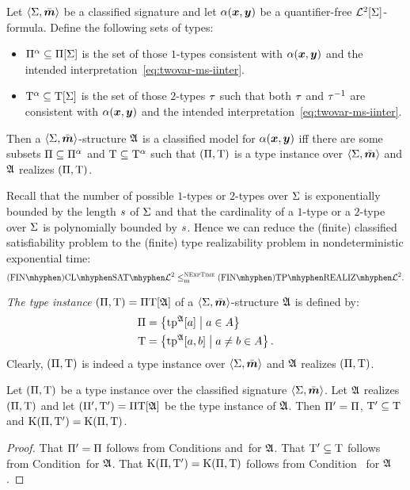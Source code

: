 \begin{remark}\label{rem:red-sat-to-real}
Let $\left\langle \mathrm{\Sigma},\bar{\bm{m}} \right\rangle$ be a classified signature and let $\alpha(\bm{x},\bm{y})$ be a
quantifier-free $\mathcal{L}^{2}[\mathrm{\Sigma}]$-formula.
Define the following sets of types:
\begin{itemize}
  \item $\Pi^\alpha \subseteq \Pi[\mathrm{\Sigma}]$ is the set of those $1$-types
  consistent with $\alpha(\bm{x},\bm{y})$ and the intended
  interpretation~\cref{eq:twovar-ms-iinter}.
  \item $\mathrm{T}^\alpha \subseteq \mathrm{T}[\mathrm{\Sigma}]$ is the set of those $2$-types $\tau$
  such that both $\tau$ and $\tau^{-1}$ are consistent with $\alpha(\bm{x},\bm{y})$
  and the intended interpretation~\cref{eq:twovar-ms-iinter}.
\end{itemize}
Then a $\left\langle \mathrm{\Sigma},\bar{\bm{m}} \right\rangle$-structure $\mathfrak{A}$ is a classified model for
$\alpha(\bm{x},\bm{y})$ iff there are some subsets $\Pi \subseteq \Pi^\alpha$ and
$\mathrm{T} \subseteq \mathrm{T}^\alpha$ such that $(\Pi,\mathrm{T})$ is a type instance
over $\left\langle \mathrm{\Sigma},\bar{\bm{m}} \right\rangle$ and $\mathfrak{A}$ realizes $(\Pi,\mathrm{T})$.

Recall that the number of possible $1$-types or $2$-types over $\mathrm{\Sigma}$ is
exponentially bounded by the length $s$ of $\mathrm{\Sigma}$ and that the cardinality
of a $1$-type or a $2$-type over $\mathrm{\Sigma}$ is polynomially bounded by $s$.
Hence we can reduce the (finite) classified satisfiability problem to the
(finite) type realizability problem in nondeterministic exponential time:
\[
  \FinAClSat{\vFo2} \red\cNExpTime \FinAReal{\vFo2}.
\]
\end{remark}

\begin{definition}
\emph{The type instance} $(\Pi,\mathrm{T}) = \Pi\mathrm{T}[\mathfrak{A}]$ of a
$\left\langle \mathrm{\Sigma},\bar{\bm{m}} \right\rangle$-structure $\mathfrak{A}$ is defined by:
\begin{align*}
  \Pi &= \left\{\operatorname{tp}^{\mathfrak{A}}[a]\mathrel{}\middle|\mathrel{}a \in A\right\} \\
  \mathrm{T} &= \left\{\operatorname{tp}^{\mathfrak{A}}[a,b]\mathrel{}\middle|\mathrel{}a\neq b \in A\right\}.
\end{align*}
Clearly, $(\Pi,\mathrm{T})$ is indeed a type instance over $\left\langle \mathrm{\Sigma},\bar{\bm{m}} \right\rangle$ and
$\mathfrak{A}$ realizes $(\Pi,\mathrm{T})$.
\end{definition}
\begin{remark}\label{rem:str-tpi-kings-eq}
Let $(\Pi,\mathrm{T})$ be a type instance over the classified signature
$\left\langle \mathrm{\Sigma},\bar{\bm{m}} \right\rangle$.
Let $\mathfrak{A}$ realizes $(\Pi,\mathrm{T})$ and let $({\Pi'},{\mathrm{T}'}) =
\Pi\mathrm{T}[\mathfrak{A}]$ be the type instance of $\mathfrak{A}$.
Then ${\Pi'} = \Pi$, ${\mathrm{T}'} \subseteq \mathrm{T}$ and $\mathrm{K}(\Pi,{\mathrm{T}'}) =
\mathrm{K}(\Pi,\mathrm{T})$.
\end{remark}
\begin{proof}
That ${\Pi'} = \Pi$ follows from Conditions 
and~ for $\mathfrak{A}$.
That ${\mathrm{T}'} \subseteq \mathrm{T}$ follows from Condition~ for
$\mathfrak{A}$.
That $\mathrm{K}(\Pi,{\mathrm{T}'}) = \mathrm{K}(\Pi,\mathrm{T})$ follows from Condition~
for $\mathfrak{A}$.
\end{proof}

